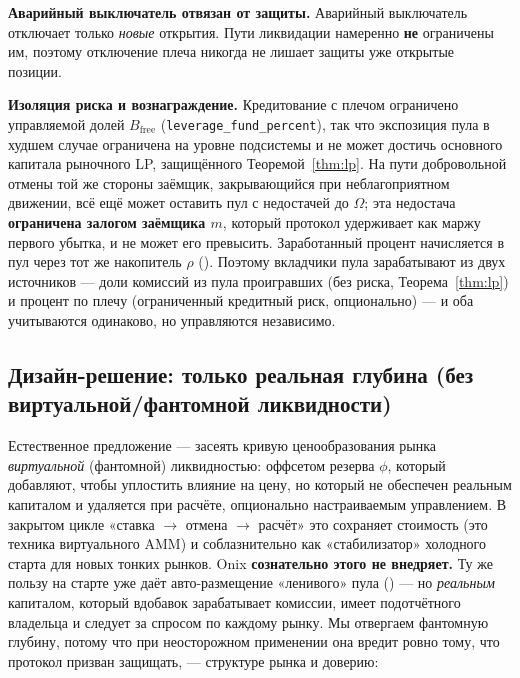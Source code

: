 \documentclass{ledger}
\theoremstyle{plain}
\theoremstyle{remark}
\begin{document}
\textbf{Аварийный выключатель отвязан от защиты.} Аварийный выключатель отключает
только \emph{новые} открытия. Пути ликвидации намеренно \textbf{не} ограничены им,
поэтому отключение плеча никогда не лишает защиты уже открытые позиции.

\textbf{Изоляция риска и вознаграждение.} Кредитование с плечом ограничено
управляемой долей $B_{\text{free}}$ (\texttt{leverage\_fund\_percent}), так что
экспозиция пула в худшем случае ограничена на уровне подсистемы и не может достичь
основного капитала рыночного LP, защищённого Теоремой~\ref{thm:lp}. На пути
добровольной отмены той же стороны заёмщик, закрывающийся при неблагоприятном
движении, всё ещё может оставить пул с недостачей до $\Omega$; эта недостача
\textbf{ограничена залогом заёмщика $m$}, который протокол удерживает как маржу
первого убытка, и не может его превысить. Заработанный процент начисляется в пул
через тот же накопитель $\rho$ (). Поэтому вкладчики пула
зарабатывают из двух источников --- доли комиссий из пула проигравших (без риска,
Теорема~\ref{thm:lp}) и процент по плечу (ограниченный кредитный риск, опционально)
--- и оба учитываются одинаково, но управляются независимо.

\subsection{Дизайн-решение: только реальная глубина (без виртуальной/фантомной ликвидности)}\label{sec:realdepth}

Естественное предложение --- засеять кривую ценообразования рынка \emph{виртуальной}
(фантомной) ликвидностью: оффсетом резерва $\phi$, который добавляют, чтобы уплостить
влияние на цену, но который не обеспечен реальным капиталом и удаляется при
расчёте, опционально настраиваемым управлением. В закрытом цикле «ставка
$\rightarrow$ отмена $\rightarrow$ расчёт» это сохраняет стоимость (это техника
виртуального AMM) и соблазнительно как «стабилизатор» холодного старта для новых
тонких рынков. Onix \textbf{сознательно этого не внедряет.} Ту же пользу на старте
уже даёт авто-размещение «ленивого» пула () --- но \emph{реальным}
капиталом, который вдобавок зарабатывает комиссии, имеет подотчётного владельца и
следует за спросом по каждому рынку. Мы отвергаем фантомную глубину, потому что при
неосторожном применении она вредит ровно тому, что протокол призван защищать, ---
структуре рынка и доверию:
\end{document}
